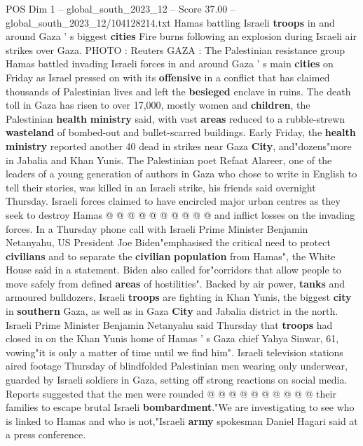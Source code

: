 \begin{textsample}{POS Dim 1 – global\_south\_2023\_12 – Score 37.00 – global\_south\_2023\_12/104128214.txt}  \label{ex:f1_pos_036}
Hamas battling Israeli \textbf{troops} in and around Gaza ' s biggest \textbf{cities} Fire burns following an explosion during Israeli air strikes over Gaza.
PHOTO : Reuters GAZA : The Palestinian resistance group Hamas battled invading Israeli forces in and around Gaza ' s main \textbf{cities} on Friday as Israel pressed on with its \textbf{offensive} in a conflict that has claimed thousands of Palestinian lives and left the \textbf{besieged} enclave in ruins.
The death toll in Gaza has risen to over 17,000, mostly women and \textbf{children}, the Palestinian \textbf{health} \textbf{ministry} said, with vast \textbf{areas} reduced to a rubble-strewn \textbf{wasteland} of bombed-out and bullet-scarred buildings.
Early Friday, the \textbf{health} \textbf{ministry} reported another 40 dead in strikes near Gaza \textbf{City}, and"dozens"more in Jabalia and Khan Yunis.
The Palestinian poet Refaat Alareer, one of the leaders of a young generation of authors in Gaza who chose to write in English to tell their stories, was killed in an Israeli strike, his friends said overnight Thursday.
Israeli forces claimed to have encircled major urban centres as they seek to destroy Hamas @ @ @ @ @ @ @ @ @ @ and inflict losses on the invading forces.
In a Thursday phone call with Israeli Prime Minister Benjamin Netanyahu, US President Joe Biden"emphasised the critical need to protect \textbf{civilians} and to separate the \textbf{civilian} \textbf{population} from Hamas", the White House said in a statement.
Biden also called for"corridors that allow people to move safely from defined \textbf{areas} of hostilities".
Backed by air power, \textbf{tanks} and armoured bulldozers, Israeli \textbf{troops} are fighting in Khan Yunis, the biggest \textbf{city} in \textbf{southern} Gaza, as well as in Gaza \textbf{City} and Jabalia district in the north.
Israeli Prime Minister Benjamin Netanyahu said Thursday that \textbf{troops} had closed in on the Khan Yunis home of Hamas ' s Gaza chief Yahya Sinwar, 61, vowing"it is only a matter of time until we find him".
Israeli television stations aired footage Thursday of blindfolded Palestinian men wearing only underwear, guarded by Israeli soldiers in Gaza, setting off strong reactions on social media.
Reports suggested that the men were rounded @ @ @ @ @ @ @ @ @ @ their families to escape brutal Israeli \textbf{bombardment}."We are investigating to see who is linked to Hamas and who is not,"Israeli \textbf{army} spokesman Daniel Hagari said at a press conference.

\end{textsample}
